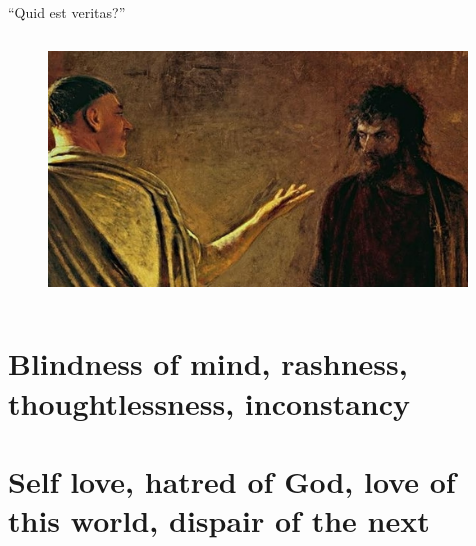 \documentclass[xcolor=dvipsnames]{beamer}
\begin{document}
\begin{frame}[fragile]{``Quid est veritas?''}
  \begin{columns}[T] %
    \begin{column}{0.9\textwidth}
      \begin{figure}[H]
        \centering
        \includegraphics[width=0.99\textwidth]{pilate}
      \end{figure}
    \end{column}%
  \end{columns}
\end{frame}


\section{Blindness of mind, rashness, thoughtlessness, inconstancy}


\section{Self love, hatred of God, love of this world, dispair of the next}


\begin{frame}[plain]
  \titlepage
\end{frame}
\end{document}

